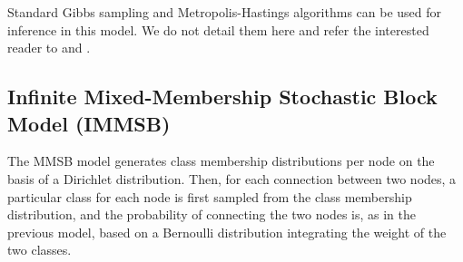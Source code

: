 Standard Gibbs sampling and Metropolis-Hastings algorithms can be used for inference in this model. We do not detail them here and refer the interested reader to \cite{ILFRM} and \cite{IBP}.

%

\subsection{Infinite Mixed-Membership Stochastic Block Model (IMMSB)}

The MMSB model generates class membership distributions per node on the basis of a Dirichlet distribution. Then, for each connection between two nodes, a particular class for each node is first sampled from the class membership distribution, and the probability of connecting the two nodes is, as in the previous model, based on a Bernoulli distribution integrating the weight of the two classes. 

